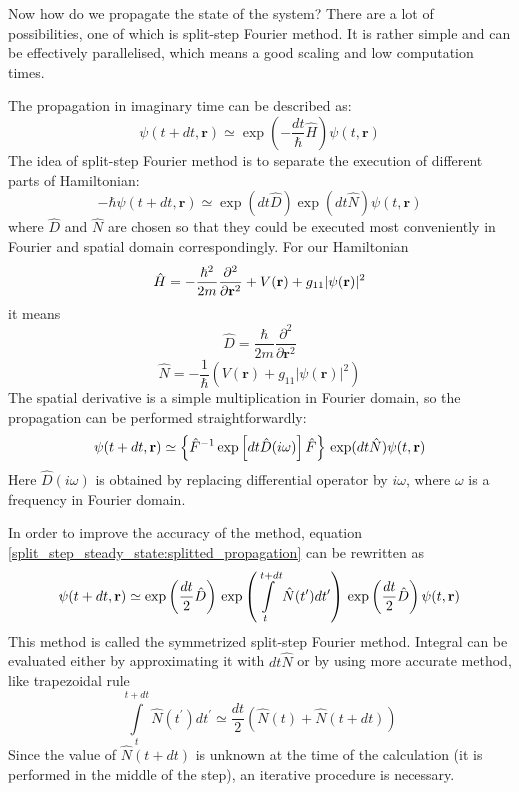 \documentclass[12pt,notitlepage]{report}
\begin{document}
Now how do we propagate the state of the system? There are a lot of possibilities, one of which is split-step
Fourier method. It is rather simple and can be effectively parallelised, which means a good scaling and 
low computation times. 

The propagation in imaginary time can be described as:
\[ \psi(t + dt, \mathbf{r}) \simeq \exp \left( -\frac{dt}{\hbar} \hat{H} \right) \psi(t, \mathbf{r}) \]
The idea of split-step Fourier method is to separate the execution of different parts of Hamiltonian:
\begin{equation}
\label{split_step_steady_state:splitted_propagation}
-\hbar \psi(t + dt, \mathbf{r}) \simeq \exp(dt \hat{D}) \exp(dt \hat{N}) \psi(t, \mathbf{r})
\end{equation}
where $\hat{D}$ and $\hat{N}$ are chosen so that they could be executed most conveniently in Fourier and spatial
domain correspondingly. For our Hamiltonian
\[ 
\hat{H} = -\frac{\hbar^2}{2m} \frac{\partial^2}{\partial \mathbf{r}^2} + \\
V(\mathbf{r}) + g_{11} \vert \psi(\mathbf{r}) \vert^2 
\]
it means
\[ \hat{D} = \frac{\hbar}{2m} \frac{\partial^2}{\partial \mathbf{r}^2} \]
\[ \hat{N} = -\frac{1}{\hbar} \left( V(\mathbf{r}) + g_{11} \vert \psi(\mathbf{r}) \vert^2 \right) \] 
The spatial derivative is a simple multiplication in Fourier domain, so the propagation can be performed 
straightforwardly:
\[ 
\psi(t + dt, \mathbf{r}) \simeq \left\{ \hat{F}^{-1} \exp \left[ dt \hat{D}(i\omega) \right] \hat{F} \right\} \\
\exp(dt \hat{N}) \psi(t, \mathbf{r}) 
\]
Here $\hat{D}(i\omega)$ is obtained by replacing differential operator by $i \omega$, where $\omega$ is a
frequency in Fourier domain.

In order to improve the accuracy of the method, equation \ref{split_step_steady_state:splitted_propagation}
can be rewritten as
\[
\psi(t + dt, \mathbf{r}) \simeq \exp \left( \frac{dt}{2} \hat{D} \right) \\
\exp \left( \int\limits^{t + dt}_t \hat{N} (t^\prime) dt^\prime \right) \\
\exp \left( \frac{dt}{2} \hat{D} \right) \psi(t, \mathbf{r})
\]
This method is called the symmetrized split-step Fourier method. Integral can be evaluated either by approximating it
with $dt\hat{N}$ or by using more accurate method, like trapezoidal rule
\[ \int\limits^{t + dt}_t \hat{N} (t^\prime) dt^\prime \simeq \frac{dt}{2} \left( \hat{N}(t) + \hat{N}(t + dt) \right) \]
Since the value of $\hat{N}(t + dt)$ is unknown at the time of the calculation (it is performed in the
middle of the step), an iterative procedure is necessary.
\end{document}
